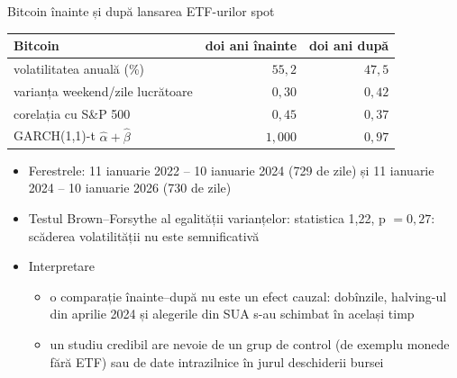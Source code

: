 \begin{frame}{Bitcoin înainte și după lansarea ETF-urilor spot}
\itemsize{\footnotesize}
\begin{center}
\footnotesize
\begin{tabular}{lrr}
\toprule
Bitcoin & doi ani înainte & doi ani după \\
\midrule
volatilitatea anuală (\%) & $55{,}2$ & $47{,}5$ \\
varianța weekend/zile lucrătoare & $0{,}30$ & $0{,}42$ \\
corelația cu S\&P 500 & $0{,}45$ & $0{,}37$ \\
GARCH(1,1)-t $\hat\alpha + \hat\beta$ & $1{,}000$ & $0{,}97$ \\
\bottomrule
\end{tabular}
\end{center}
\begin{itemize}
    \item Ferestrele: 11 ianuarie 2022 -- 10 ianuarie 2024 (729 de zile) și 11 ianuarie 2024 -- 10 ianuarie 2026 (730 de zile)
    \item Testul Brown--Forsythe al egalității varianțelor: statistica 1{,}22, p $= 0{,}27$: scăderea volatilității nu este semnificativă
    \item Interpretare
    \begin{itemize}
        \item o comparație înainte--după nu este un efect cauzal: dobînzile, halving-ul din aprilie 2024 și alegerile din SUA s-au schimbat în același timp
        \item un studiu credibil are nevoie de un grup de control (de exemplu monede fără ETF) sau de date intrazilnice în jurul deschiderii bursei
    \end{itemize}
\end{itemize}
\end{frame}

